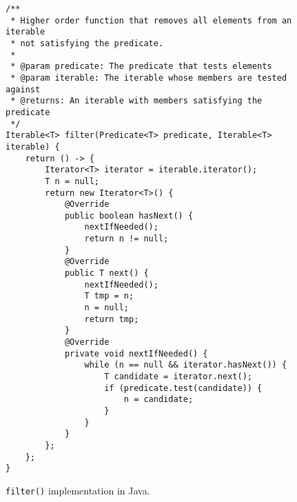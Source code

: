 \documentclass[abstracton,12pt]{scrartcl}
\theoremstyle{definition}
\begin{document}
\begin{figure}[h]
  \begin{framed}
\begin{verbatim}
/**
 * Higher order function that removes all elements from an iterable
 * not satisfying the predicate.
 *
 * @param predicate: The predicate that tests elements
 * @param iterable: The iterable whose members are tested against
 * @returns: An iterable with members satisfying the predicate
 */
Iterable<T> filter(Predicate<T> predicate, Iterable<T> iterable) {
    return () -> {
        Iterator<T> iterator = iterable.iterator();
        T n = null;
        return new Iterator<T>() {
            @Override
            public boolean hasNext() {
                nextIfNeeded();
                return n != null; 
            }
            @Override
            public T next() {
                nextIfNeeded();
                T tmp = n;
                n = null;
                return tmp;
            }
            @Override
            private void nextIfNeeded() {
                while (n == null && iterator.hasNext()) {
                    T candidate = iterator.next();
                    if (predicate.test(candidate)) {
                        n = candidate;
                    }
                }
            }
        };
    };
}
\end{verbatim}
  \end{framed}
  \caption{\texttt{filter()} implementation in Java.}
  \label{fig:java_filter}
\end{figure}
\end{document}

